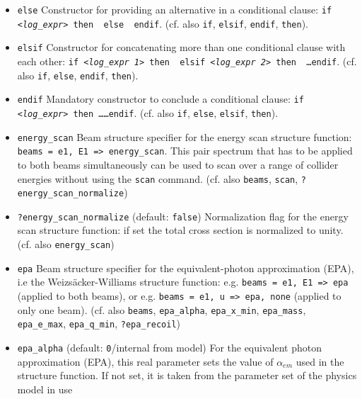 \documentclass[12pt]{book}
\newcommand{\ttt}[1]{\texttt{#1}}
\begin{document}
\begin{itemize}
{  B]}. (cf. \ttt{eval}, \ttt{cuts}, \ttt{selection}) 
\item
\ttt{else} \label{sindarin_else}\newline 
Constructor for providing an alternative in a conditional clause: 
\ttt{if {\em <log\_expr>} then {\em <expr 1>} else {\em <expr 2>} endif}. (cf. also
\ttt{if}, \ttt{elsif}, \ttt{endif}, \ttt{then}).
\item
\ttt{elsif} \newline 
Constructor for concatenating more than one conditional clause with
each other: \ttt{if {\em <log\_expr 1>} then {\em <expr 1>} elsif {\em <log\_expr 2>}
then {\em <expr 2>} \ldots endif}. (cf. also \ttt{if}, \ttt{else},
\ttt{endif}, \ttt{then}). 
\item
\ttt{endif} \newline
Mandatory constructor to conclude a conditional clause: \ttt{if
  {\em <log\_expr>} then \ldots \ldots endif}. (cf. also \ttt{if},
\ttt{else}, \ttt{elsif}, \ttt{then}).
\item
\ttt{energy\_scan} \newline
Beam structure specifier for the energy scan structure function:
\ttt{beams = e1, E1 => energy\_scan}. This pair spectrum that has to
be applied to both beams simultaneously can be used to scan over a
range of collider energies without using the \ttt{scan} command.
(cf. also \ttt{beams}, \ttt{scan}, \ttt{?energy\_scan\_normalize})
\item
\ttt{?energy\_scan\_normalize} \qquad (default: \ttt{false}) \newline
Normalization flag for the energy scan structure function: if set the
total cross section is normalized to unity. (cf. also
\ttt{energy\_scan})
\item
\ttt{epa} \newline
Beam structure specifier for the equivalent-photon approximation
(EPA), i.e the Weizs\"acker-Williams structure function:
e.g. \ttt{beams = e1, E1 => epa} (applied to both beams), or
e.g. \ttt{beams = e1, u => epa, none} (applied to only one
beam). (cf. also \ttt{beams}, \ttt{epa\_alpha}, \ttt{epa\_x\_min},
\ttt{epa\_mass}, \ttt{epa\_e\_max}, \ttt{epa\_q\_min},
\ttt{?epa\_recoil}) 
\item
\ttt{epa\_alpha} \qquad (default: \ttt{0}/internal from model)
\newline
For the equivalent photon approximation (EPA), this real parameter
sets the value of $\alpha_{em}$ used in the structure function. If not
set, it is taken from the parameter set of the physics model in use

\end{itemize}
\end{document}
